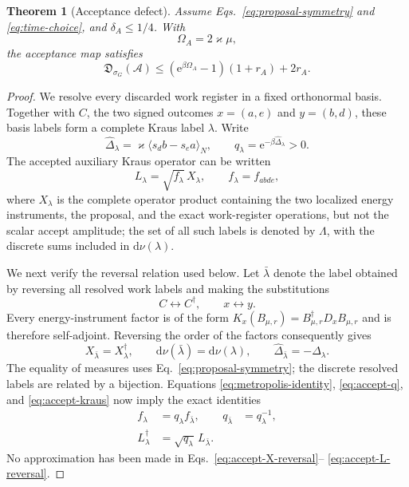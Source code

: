 \documentclass[aps,floatfix,10pt,amssymb,amsmath,superscriptaddress,nofootinbib,longbibliography,nobalancelastpage,twocolumn]{revtex4-2}
\newtheorem{theorem}{Theorem}
\newcommand{\cA}{\mathcal{A}}
\newcommand{\e}{\mathrm{e}}
\newcommand{\dd}{\mathrm{d}}
\begin{document}
\begin{theorem}[Acceptance defect]
\label{thm:acceptance}
Assume Eqs.~\eqref{eq:proposal-symmetry} and \eqref{eq:time-choice}, and $\delta_A\leq1/4$.  With
\begin{equation}
 \Omega_A=2\varkappa\mu,
 \label{eq:OmegaA}
\end{equation}
the acceptance map satisfies
\begin{equation}
 \mathfrak D_{\sigma_G}(\cA)
 \leq(\e^{\beta\Omega_A}-1)(1+r_A)+2r_A.
 \label{eq:acceptance-bound}
\end{equation}
\end{theorem}
\begin{proof}
We resolve every discarded work register in a fixed orthonormal
basis.  Together with $C$, the two signed outcomes
$x=(a,e)$ and $y=(b,d)$, these basis labels form a complete Kraus
label $\lambda$.  Write
\begin{equation}
 \widehat\Delta_\lambda
 =\varkappa\langle s_db-s_ea\rangle_N,
 \qquad
 q_\lambda=\e^{-\beta\widehat\Delta_\lambda}>0.
 \label{eq:accept-q}
\end{equation}
The accepted auxiliary Kraus operator can be written
\begin{equation}
 L_\lambda=\sqrt{f_\lambda}\,X_\lambda,
 \qquad f_\lambda=f_{abde},
 \label{eq:accept-kraus}
\end{equation}
where $X_\lambda$ is the complete operator product containing the two
localized energy instruments, the proposal, and the exact work-register
operations, but not the scalar accept amplitude; the set of all such
labels is denoted by $\Lambda$, with the discrete sums included in
$\dd\nu(\lambda)$.

We next verify the reversal relation used below.  Let $\bar\lambda$
denote the label obtained by reversing all resolved work labels and making
the substitutions
\begin{equation}
 C\longleftrightarrow C^\dagger,\qquad
 x\longleftrightarrow y.
 \label{eq:accept-reversal}
\end{equation}
Every energy-instrument factor is of the form
$K_x(B_{\mu,r})=B_{\mu,r}^\dagger D_xB_{\mu,r}$ and is therefore
self-adjoint.  Reversing the order of the factors consequently gives
\begin{equation}
 X_{\bar\lambda}=X_\lambda^\dagger,\qquad
 \dd\nu(\bar\lambda)=\dd\nu(\lambda),\qquad
 \widehat\Delta_{\bar\lambda}=-\widehat\Delta_\lambda.
 \label{eq:accept-X-reversal}
\end{equation}
The equality of measures uses Eq.~\eqref{eq:proposal-symmetry}; the
discrete resolved labels are related by a bijection.  Equations
\eqref{eq:metropolis-identity}, \eqref{eq:accept-q}, and
\eqref{eq:accept-kraus} now imply the exact identities
\begin{align}
 f_\lambda&=q_\lambda f_{\bar\lambda},
 &q_{\bar\lambda}&=q_\lambda^{-1},
 \label{eq:accept-f-reversal}\\
 L_\lambda^\dagger
 &=\sqrt{q_\lambda}\,L_{\bar\lambda}.
 \label{eq:accept-L-reversal}
\end{align}
No approximation has been made in Eqs.~\eqref{eq:accept-X-reversal}--
\eqref{eq:accept-L-reversal}.


\end{proof}
\end{document}
